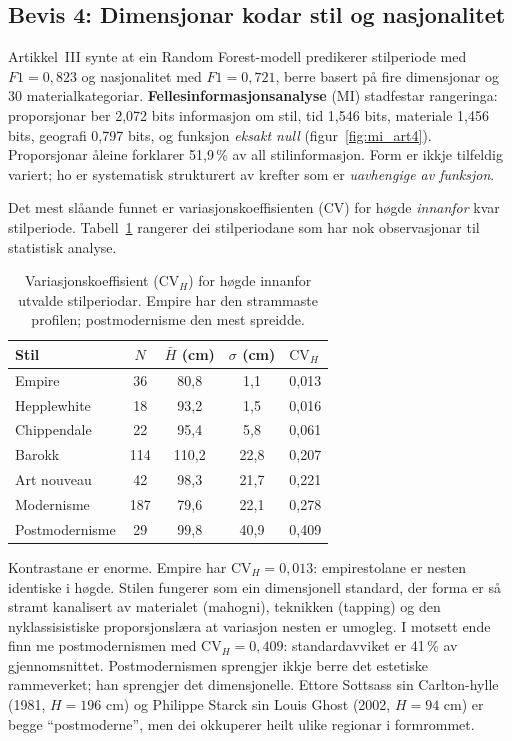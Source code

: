 \documentclass[10pt, a4paper, twocolumn]{article}
\begin{document}
\subsection{Bevis 4: Dimensjonar kodar stil og nasjonalitet}

Artikkel~III synte at ein Random Forest-modell \citep{breiman2001} predikerer stilperiode med $F1 = 0{,}823$ og nasjonalitet med $F1 = 0{,}721$, berre basert på fire dimensjonar og 30 materialkategoriar. \textbf{Fellesinformasjonsanalyse} (MI) stadfestar rangeringa: proporsjonar ber 2,072 bits informasjon om stil, tid 1,546 bits, materiale 1,456 bits, geografi 0,797 bits, og funksjon \emph{eksakt null} (figur~\ref{fig:mi_art4}). Proporsjonar åleine forklarer 51,9\,\% av all stilinformasjon. Form er ikkje tilfeldig variert; ho er systematisk strukturert av krefter som er \emph{uavhengige av funksjon}.

Det mest slåande funnet er variasjonskoeffisienten (CV) for høgde \emph{innanfor} kvar stilperiode. Tabell~\ref{tab:cv_stil} rangerer dei stilperiodane som har nok observasjonar til statistisk analyse.

\begin{table}[H]
\centering
\caption{Variasjonskoeffisient ($\text{CV}_H$) for høgde innanfor utvalde stilperiodar. Empire har den strammaste profilen; postmodernisme den mest spreidde.}
\label{tab:cv_stil}
\begin{tabular}{lcccl}
\toprule
\textbf{Stil} & $N$ & $\bar{H}$ (cm) & $\sigma$ (cm) & $\text{CV}_H$ \\
\midrule
Empire          & 36  & 80,8 & 1,1  & 0,013 \\
Hepplewhite     & 18  & 93,2 & 1,5  & 0,016 \\
Chippendale     & 22  & 95,4 & 5,8  & 0,061 \\
Barokk          & 114 & 110,2 & 22,8 & 0,207 \\
Art nouveau     & 42  & 98,3 & 21,7 & 0,221 \\
Modernisme      & 187 & 79,6 & 22,1 & 0,278 \\
Postmodernisme  & 29  & 99,8 & 40,9 & 0,409 \\
\bottomrule
\end{tabular}
\end{table}

Kontrastane er enorme. Empire har $\text{CV}_H = 0{,}013$: empirestolane er nesten identiske i høgde. Stilen fungerer som ein dimensjonell standard, der forma er så stramt kanalisert av materialet (mahogni), teknikken (tapping) og den nyklassisistiske proporsjonslæra at variasjon nesten er umogleg. I motsett ende finn me postmodernismen med $\text{CV}_H = 0{,}409$: standardavviket er 41\,\% av gjennomsnittet. Postmodernismen sprengjer ikkje berre det estetiske rammeverket; han sprengjer det dimensjonelle. Ettore Sottsass sin Carlton-hylle (1981, $H = 196$ cm) og Philippe Starck sin Louis Ghost (2002, $H = 94$ cm) er begge ``postmoderne'', men dei okkuperer heilt ulike regionar i formrommet.
\end{document}
